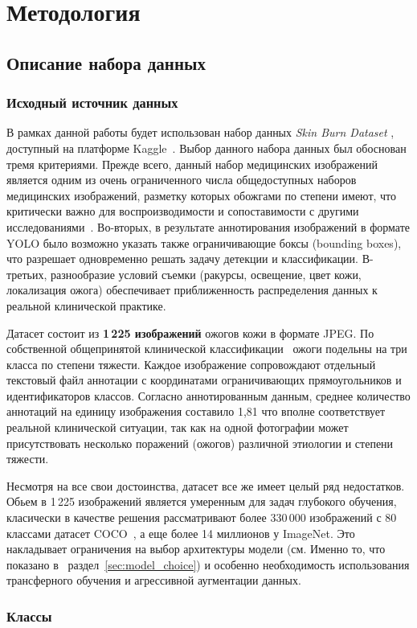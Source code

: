 \chapter{Методология}
\label{chap:methodology}
\setlength{\parskip}{0.8em}

\section{Описание набора данных}
\subsection{Исходный источник данных}
В рамках данной работы будет использован набор данных \textit{Skin Burn Dataset} , доступный на платформе Kaggle~\cite{kaggle_burn_dataset}. Выбор данного набора данных был обоснован тремя критериями. Прежде всего, данный набор медицинских изображений является одним из очень ограниченного числа общедоступных наборов медицинских изображений, разметку которых обожгами по степени имеют, что критически важно для воспроизводимости и сопоставимости с другими исследованиями~\cite{chauhan2020burn,khan2021burn}. Во-вторых, в результате аннотирования изображений в формате YOLO было возможно указать также ограничивающие боксы (bounding boxes), что разрешает одновременно решать задачу детекции и классификации. В-третьих, разнообразие условий съемки (ракурсы, освещение, цвет кожи, локализация ожога) обеспечивает приближенность распределения данных к реальной клинической практике.

Датасет состоит из \textbf{1\,225 изображений} ожогов кожи в формате JPEG. По собственной общепринятой клинической классификации~\cite{peck2012burns} ожоги подельны на три класса по степени тяжести. Каждое изображение сопровождают отдельный текстовый файл аннотации с координатами ограничивающих прямоугольников и идентификаторов классов. Согласно аннотированным данным, среднее количество аннотаций на единицу изображения составило 1,81 что вполне соответствует реальной клинической ситуации, так как на одной фотографии может присутствовать несколько поражений (ожогов) различной этиологии и степени тяжести.

Несмотря на все свои достоинства, датасет все же имеет целый ряд недостатков. Обьем в 1\,225 изображений является умеренным для задач глубокого обучения, класически в качестве решения рассматривают более 330\,000 изображений с 80 классами датасет COCO~\cite{lin2014coco}, а еще более 14 миллионов у ImageNet. Это накладывает ограничения на выбор архитектуры модели (см. Именно то, что показано в ~раздел~\ref{sec:model_choice}) и особенно необходимость использования трансферного обучения и агрессивной аугментации данных. \subsection{Классы}

